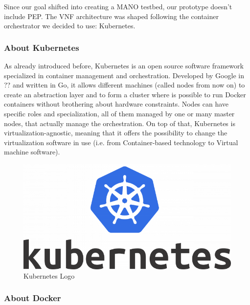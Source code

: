 \documentclass[10pt]{book}
\begin{document}
Since our goal shifted into creating a MANO testbed, our prototype doesn't
include PEP. The VNF architecture was shaped following the container
orchestrator we decided to use: Kubernetes.

\subsubsection{About Kubernetes}

As already introduced before, Kubernetes is an open source software framework
specialized in container management and orchestration. Developed by Google in
?? and written in Go, it allows different
machines (called nodes from now on) to create an abstraction layer and to form
a cluster where is possible to run Docker containers without brothering about
hardware constraints. Nodes can have specific roles and specialization, all of
them managed by one or many master nodes, that actually manage the
orchestration.
On top of that, Kubernetes is virtualization-agnostic, meaning that it offers
the possibility to change the virtualization software in use (i.e. from
Container-based technology to Virtual machine software).
\begin{figure}[h]
 \centering
 \includegraphics[scale=0.35]{kubernetes_logo}
 \caption{Kubernetes Logo}
 \label{chap:intro:img:k8s_logo}
\end{figure}


\subsubsection{About Docker}
\end{document}
